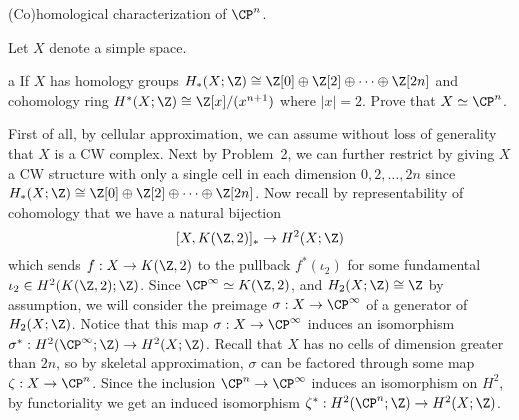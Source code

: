 \documentclass[11pt,letterpaper]{article}
\begin{document}
\begin{problem}
    (Co)homological characterization of $\CP^n$.
\end{problem}

\begin{solution}
    Let $X$ denote a simple space.
    \begin{partproblem}{a}
        If $X$ has homology groups $H_*(X; \Z)\cong \Z[0]\oplus \Z[2]\oplus \cdots\oplus \Z[2n]$ and cohomology ring $H^*(X; \Z)\cong \Z[x] / (x^{n+1})$ where $|x|=2$. Prove that $X\simeq \CP^n$.
    \end{partproblem}

    \quad First of all, by cellular approximation, we can assume without loss of generality that $X$ is a CW complex. Next by Problem~2, we can further restrict by giving $X$ a CW structure with only a single cell in each dimension $0, 2,\ldots, 2n$ since $H_*(X; \Z)\cong \Z[0]\oplus \Z[2]\oplus \cdots\oplus \Z[2n]$. Now recall by representability of cohomology that we have a natural bijection
    \[
        [X, K(\Z, 2)]_* \to H^2(X; \Z)
    \]
    which sends $f : X \to K(\Z, 2)$ to the pullback $f^*(\iota_2)$ for some fundamental $\iota_2\in H^2(K(\Z,2); \Z)$. Since $\CP^\infty \simeq K(\Z,2)$, and $H_2(X; \Z)\cong \Z$ by assumption, we will consider the preimage $\sigma : X \to \CP^\infty$ of a generator of $H_2(X; \Z)$. Notice that this map $\sigma : X \to \CP^\infty$ induces an isomorphism $\sigma^* : H^2(\CP^\infty; \Z) \to H^2(X; \Z)$. Recall that $X$ has no cells of dimension greater than $2n$, so by skeletal approximation, $\sigma$ can be factored through some map $\zeta : X \to \CP^n$. Since the inclusion $\CP^n \to \CP^\infty$ induces an isomorphism on $H^2$, by functoriality we get an induced isomorphism $\zeta^* : H^2(\CP^n; \Z) \to H^2(X; \Z)$.


\end{solution}
\end{document}
